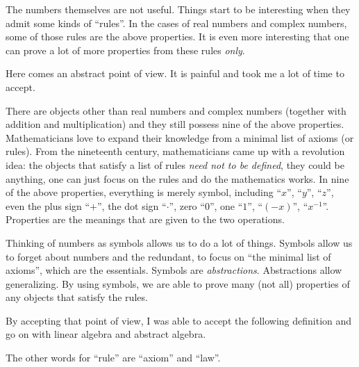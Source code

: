 \begin{note}
	The numbers themselves are not useful. Things start to be interesting when they admit some kinds of ``rules''. In the cases of real numbers and complex numbers, some of those rules are the above properties. It is even more interesting that one can prove a lot of more properties from these rules \textit{only}.

	Here comes an abstract point of view. It is painful and took me a lot of time to accept.

	There are objects other than real numbers and complex numbers (together with addition and multiplication) and they still possess nine of the above properties. Mathematicians love to expand their knowledge from a minimal list of axioms (or rules). From the nineteenth century, mathematicians came up with a revolution idea: the objects that satisfy a list of rules \textit{need not to be defined}, they could be anything, one can just focus on the rules and do the mathematics works. In nine of the above properties, everything is merely symbol, including ``$x$'', ``$y$'', ``$z$'', even the plus sign ``$+$'', the dot sign ``$\cdot$'', zero ``$0$'', one ``$1$'', ``$(-x)$'', ``$x^{-1}$''. Properties are the meanings that are given to the two operations.

	Thinking of numbers as symbols allows us to do a lot of things. Symbols allow us to forget about numbers and the redundant, to focus on ``the minimal list of axioms'', which are the essentials. Symbols are \textit{abstractions}. Abstractions allow generalizing. By using symbols, we are able to prove many (not all) properties of any objects that satisfy the rules.

	By accepting that point of view, I was able to accept the following definition and go on with linear algebra and abstract algebra.

	The other words for ``rule'' are ``axiom'' and ``law''.
\end{note}

